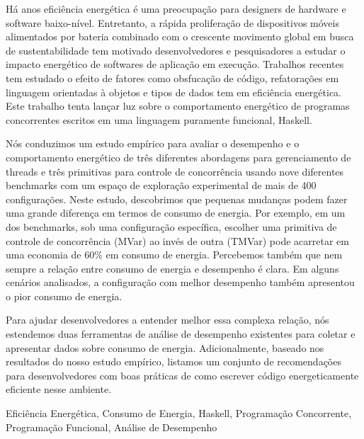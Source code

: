 Há anos eficiência energética é uma preocupação para designers de hardware e software baixo-nível. Entretanto, a rápida proliferação de dispositivos móveis alimentados por bateria combinado com o crescente movimento global em busca de sustentabilidade tem motivado desenvolvedores e pesquisadores a estudar o impacto energético de softwares de aplicação em execução. Trabalhos recentes tem estudado o efeito de fatores como obsfucação de código, refatorações em linguagem orientadas à objetos e tipos de dados tem em eficiência energética. Este trabalho tenta lançar luz sobre o comportamento energético de programas concorrentes escritos em uma linguagem puramente funcional, Haskell.

Nós conduzimos um estudo empírico para avaliar o desempenho e o comportamento energético de três diferentes abordagens para gerenciamento de threads e três primitivas para controle de concorrência usando nove diferentes benchmarks com um espaço de exploração experimental de mais de 400 configurações. Neste estudo, descobrimos que pequenas mudanças podem fazer uma grande diferença em termos de consumo de energia. Por exemplo, em um dos benchmarks, sob uma configuração específica, escolher uma primitiva de controle de concorrência (MVar) ao invés de outra (TMVar) pode acarretar em uma economia de 60\% em consumo de energia. Percebemos também que nem sempre a relação entre consumo de energia e desempenho é clara. Em alguns cenários analisados, a configuração com melhor desempenho também apresentou o pior consumo de energia.

Para ajudar desenvolvedores a entender melhor essa complexa relação, nós estendemos duas ferramentas de análise de desempenho existentes para coletar e apresentar dados sobre consumo de energia. Adicionalmente, baseado nos resultados do nosso estudo empírico, listamos um conjunto de recomendações para desenvolvedores com boas práticas de como escrever código energeticamente eficiente nesse ambiente.

\begin{keywords}
Eficiência Energética, Consumo de Energia, Haskell, Programação Concorrente, Programação Funcional, Análise de Desempenho
\end{keywords}
